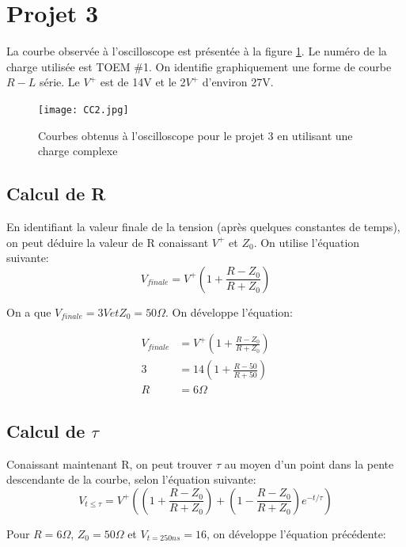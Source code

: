 \clearpage
\newpage
\section{Projet 3}
La courbe observée à l'oscilloscope est présentée à la figure \ref{CC2}. Le numéro de la charge utilisée est TOEM \#1. On identifie graphiquement une forme de courbe $R-L$ série.  Le $V^{+}$  est de 14V et le 2$V^{+}$ d'environ 27V.

\begin{figure}[htb]
\begin{center}
\texttt{[image: CC2.jpg]}
\caption{Courbes obtenus à l'oscilloscope pour le projet 3 en utilisant une charge complexe}
\label{CC2}
\end{center}
\end{figure}

\subsection*{Calcul de R}
En identifiant la valeur finale de la tension (après quelques constantes de temps), on peut déduire la valeur de R conaissant $V^{+}$  et $Z_0$. On utilise l'équation suivante:
\begin{equation}
V_{finale} = V^{+} \left( 1 + \frac{R - Z_0}{R + Z_0}\right)
\end{equation}

On a que $V_{finale} = 3V et Z_0 = 50 \Omega$. On développe l'équation:

\begin{align*}
V_{finale} &= V^{+} \left( 1 + \frac{R - Z_0}{R + Z_0}\right)\\
3 &= 14 \left( 1 + \frac{R - 50}{R + 50}\right)\\
R &= 6 \Omega
\end{align*}

\subsection*{Calcul de $\tau$}

Conaissant maintenant R, on peut trouver $\tau$ au moyen d'un point dans la pente descendante de la courbe, selon l'équation suivante:
\begin{equation}
V_{t\leq \tau} = V^{+} \left( \left(1 + \frac{R - Z_0}{R + Z_0}\right) + \left(1 -\frac{R - Z_0}{R + Z_0}\right) e^{-t/\tau} \right)
\end{equation}

Pour $R=6 \Omega$, $Z_0 = 50 \Omega$ et $V_{t= 250ns} = 16$, on développe l'équation précédente:

